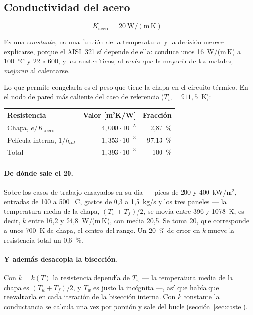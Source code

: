 \documentclass[11pt,a4paper]{article}
\begin{document}
\subsection{Conductividad del acero}
\label{sec:kacero}

\[
  K_{\mathrm{acero}} = 20~\mathrm{W/(m\,K)}
\]

Es una \emph{constante}, no una función de la temperatura, y la decisión merece
explicarse, porque el AISI~321 sí depende de ella: conduce unos 16~W/(m\,K) a
100~$^\circ$C y 22 a 600, y los austeníticos, al revés que la mayoría de los
metales, \emph{mejoran} al calentarse.

Lo que permite congelarla es el peso que tiene la chapa en el circuito térmico.
En el nodo de pared más caliente del caso de referencia ($T_w = 911{,}5$~K):

\begin{center}
\begin{tabular}{lrr}
  \toprule
  Resistencia & Valor [m$^2$K/W] & Fracción \\
  \midrule
  Chapa, $e/K_{\mathrm{acero}}$   & $4{,}000\cdot10^{-5}$ & 2,87~\% \\
  Película interna, $1/h_{int}$   & $1{,}353\cdot10^{-3}$ & 97,13~\% \\
  \midrule
  Total                           & $1{,}393\cdot10^{-3}$ & 100~\% \\
  \bottomrule
\end{tabular}
\end{center}

\paragraph{De dónde sale el 20.} Sobre los casos de trabajo ensayados en su día
--- picos de 200 y 400~kW/m$^2$, entradas de 100 a 500~$^\circ$C, gastos de 0,3 a
1,5~kg/s y los tres paneles --- la temperatura media de la chapa, $(T_w+T_f)/2$,
se movía entre 396 y 1078~K, es decir, $k$ entre 16,2 y 24,8~W/(m\,K), con media
20,5. Se toma 20, que corresponde a unos 700~K de chapa, el centro del rango. Un
20~\% de error en $k$ mueve la resistencia total un 0,6~\%.

\paragraph{Y además desacopla la bisección.} Con $k = k(T)$ la resistencia
dependía de $T_w$ --- la temperatura media de la chapa es $(T_w + T_f)/2$, y
$T_w$ es justo la incógnita ---, así que había que reevaluarla en cada iteración
de la bisección interna. Con $k$ constante la conductancia se calcula una vez
por porción y sale del bucle (sección~\ref{sec:coste}).
\end{document}
